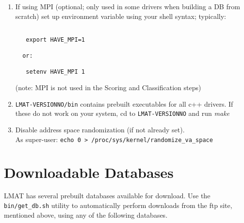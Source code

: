 \documentclass[11pt]{article}
\newcommand{\lmatver}{VERSIONNO}
\begin{document}
\begin{enumerate}

%
%
%
%
%
%


\item

If using MPI (optional; only used in some drivers when building
    a DB from scratch) set up environment variable using your shell syntax; typically: 
\begin{verbatim}

   export HAVE_MPI=1

  or:

   setenv HAVE_MPI 1
\end{verbatim}

   (note: MPI is not used in the Scoring and Classification
    steps)


\item

         \texttt{LMAT-\lmatver/bin} contains prebuilt executables for all c++ drivers.
         If these do not work on your system,
         cd to \texttt{LMAT-\lmatver} and run {\em make}
\item
 Disable address space randomization (if not already set).\\
   As super-user: \texttt{echo 0 > /proc/sys/kernel/randomize\_va\_space}
\end{enumerate}

\section{Downloadable Databases}
\label{sec:downloads}


LMAT has several prebuilt databases available for download.  Use the \texttt{bin/get\_db.sh} utility to automatically perform downloads from the ftp site, mentioned above, using any of the following databases.  
\end{document}
